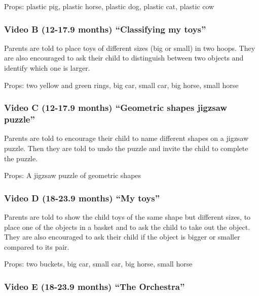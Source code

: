 \documentclass[]{article}
\begin{document}
Props: plastic pig, plastic horse, plastic dog, plastic cat, plastic cow

\hypertarget{video-b-12-17.9-months-classifying-my-toys}{%
\subsubsection{Video B (12-17.9 months) ``Classifying my
toys''}\label{video-b-12-17.9-months-classifying-my-toys}}

Parents are told to place toys of different sizes (big or small) in two
hoops. They are also encouraged to ask their child to distinguish
between two objects and identify which one is larger.

Props: two yellow and green rings, big car, small car, big horse, small
horse

\hypertarget{video-c-12-17.9-months-geometric-shapes-jigzsaw-puzzle}{%
\subsubsection{Video C (12-17.9 months) ``Geometric shapes jigzsaw
puzzle''}\label{video-c-12-17.9-months-geometric-shapes-jigzsaw-puzzle}}

Parents are told to encourage their child to name different shapes on a
jigzsaw puzzle. Then they are told to undo the puzzle and invite the
child to complete the puzzle.

Props: A jigzsaw puzzle of geometric shapes

\hypertarget{video-d-18-23.9-months-my-toys}{%
\subsubsection{Video D (18-23.9 months) ``My
toys''}\label{video-d-18-23.9-months-my-toys}}

Parents are told to show the child toys of the same shape but different
sizes, to place one of the objects in a basket and to ask the child to
take out the object. They are also encouraged to ask their child if the
object is bigger or smaller compared to its pair.

Props: two buckets, big car, small car, big horse, small horse

\hypertarget{video-e-18-23.9-months-the-orchestra}{%
\subsubsection{Video E (18-23.9 months) ``The
Orchestra''}\label{video-e-18-23.9-months-the-orchestra}}
\end{document}
